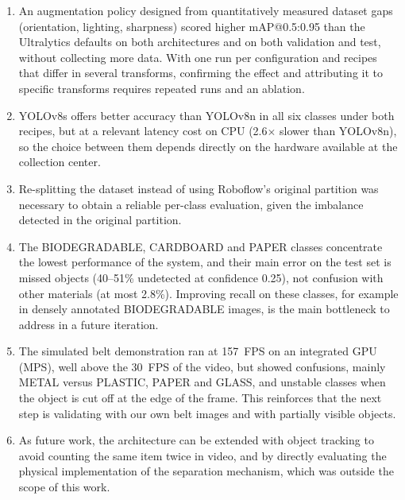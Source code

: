 \documentclass[conference]{IEEEtran}
\begin{document}
\begin{enumerate}
\item An augmentation policy designed from quantitatively measured dataset gaps (orientation,
lighting, sharpness) scored higher mAP@0.5:0.95 than the Ultralytics defaults on both
architectures and on both validation and test, without collecting more data. With one run per
configuration and recipes that differ in several transforms, confirming the effect and
attributing it to specific transforms requires repeated runs and an ablation.

\item YOLOv8s offers better accuracy than YOLOv8n in all six classes under both recipes, but
at a relevant latency cost on CPU (2.6$\times$ slower than YOLOv8n), so the choice between
them depends directly on the hardware available at the collection center.

\item Re-splitting the dataset instead of using Roboflow's original partition was necessary to
obtain a reliable per-class evaluation, given the imbalance detected in the original
partition.

\item The BIODEGRADABLE, CARDBOARD and PAPER classes concentrate the lowest performance of the
system, and their main error on the test set is missed objects (40--51\% undetected at
confidence 0.25), not confusion with other materials (at most 2.8\%). Improving recall on
these classes, for example in densely annotated BIODEGRADABLE images, is the main bottleneck
to address in a future iteration.

\item The simulated belt demonstration ran at 157~FPS on an integrated GPU
(MPS), well above the 30~FPS of the video, but showed confusions, mainly METAL versus
PLASTIC, PAPER and GLASS, and unstable classes when the object is cut off at the edge of the
frame. This reinforces that the next step is validating with our own belt
images and with partially visible objects.

\item As future work, the architecture can be extended with object tracking to avoid counting
the same item twice in video, and by directly evaluating the physical implementation of the
separation mechanism, which was outside the scope of this work.
\end{enumerate}



\end{document}
